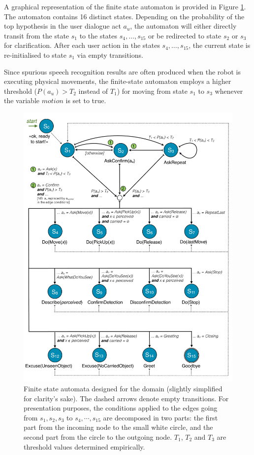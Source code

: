 A graphical representation of the finite state automaton is provided in Figure \ref{fig:fsa-exp3}.  The automaton contains 16 distinct states.  Depending on the probability of the top hypothesis in the user dialogue act $a_u$, the automaton will either directly transit from the state $s_1$ to the states $s_4, \dots, s_{15}$ or be redirected to state $s_2$ or $s_3$ for clarification. After each user action in the states $s_4, \dots, s_{15}$, the current state is re-initialised to state $s_1$ via empty transitions. 

Since spurious speech recognition results are often produced when the robot is executing physical movements, the finite-state automaton employs a higher threshold ($P(a_u) > T_2$ instead of $T_1$) for moving from state $s_1$ to $s_3$ whenever the variable $\mathit{motion}$ is set to true.


\begin{figure}[p]
\centering
\includegraphics[scale=0.36]{imgs/fsa-exp3.pdf} 
\caption{Finite state automata designed for the domain (slightly simplified for clarity's sake). The dashed arrows denote empty transitions. For presentation purposes, the conditions applied to the edges going from $s_1,s_2,s_3$ to $s_4, \cdots, s_{15}$ are decomposed in two parts: the first part from the incoming node to the small white circle, and the second part from the circle to the outgoing node. $T_1$, $T_2$ and $T_3$ are threshold values determined empirically.}
\label{fig:fsa-exp3}
\end{figure}


